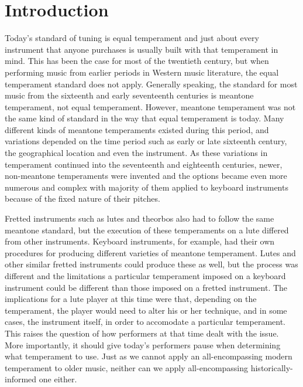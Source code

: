 \chapter*{Introduction}

Today's standard of tuning is equal temperament and just about every instrument that
anyone purchases is usually built with that temperament in mind.  This has been the
case for most of the twentieth century, but when performing music from earlier periods
in Western music literature, the equal temperament standard does not apply.  Generally
speaking, the standard for most music from the sixteenth and early seventeenth
centuries is meantone temperament, not equal temperament. However, meantone temperament
was not the same kind of standard in the way that equal temperament is today.  Many
different kinds of meantone temperaments existed during this period, and variations
depended on the time period such as early or late sixteenth century, the geographical
location and even the instrument.  As these variations in temperament continued into
the seventeenth and eighteenth centuries, newer, non-meantone temperaments were
invented and the options became even more numerous and complex with majority of them
applied to keyboard instruments because of the fixed nature of their pitches.

Fretted instruments such as lutes and theorbos also had to follow the same meantone
standard, but the execution of these temperaments on a lute differed from other
instruments. Keyboard instruments, for example, had their own procedures for producing
different varieties of meantone temperament.  Lutes and other similar fretted
instruments could produce these as well, but the process was different
and the limitations a particular temperament imposed on a keyboard instrument could be
different than those imposed on a fretted instrument.  The implications for a lute
player at this time were that, depending on the temperament, the player would need to
alter his or her technique, and in some cases, the instrument itself, in order to
accomodate a particular temperament. This raises the question of how performers at that
time dealt with the issue.  More importantly, it should give today's performers pause
when determining what temperament to use.  Just as we cannot apply an all-encompassing
modern temperament to older music, neither can we apply all-encompassing
historically-informed one either.

